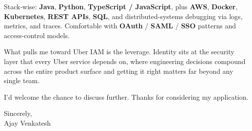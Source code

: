 \documentclass[letterpaper,11pt]{article}
\begin{document}
Stack-wise: \textbf{Java}, \textbf{Python}, \textbf{TypeScript / JavaScript}, plus \textbf{AWS}, \textbf{Docker}, \textbf{Kubernetes}, \textbf{REST APIs}, \textbf{SQL}, and distributed-systems debugging via logs, metrics, and traces. Comfortable with \textbf{OAuth} / \textbf{SAML} / \textbf{SSO} patterns and access-control models.

What pulls me toward Uber IAM is the leverage. Identity sits at the security layer that every Uber service depends on, where engineering decisions compound across the entire product surface and getting it right matters far beyond any single team.

I'd welcome the chance to discuss further. Thanks for considering my application.

\vspace{12pt}
Sincerely, \\
Ajay Venkatesh
\end{document}
